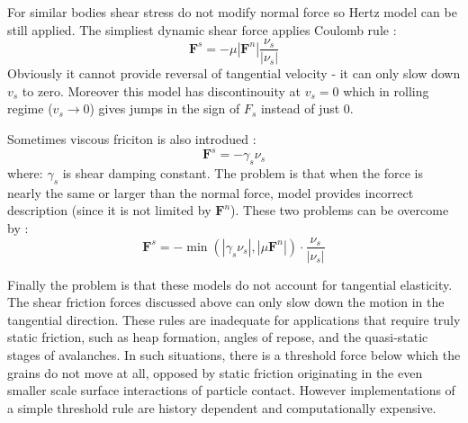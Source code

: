 \documentclass[10pt,a4paper]{article}
\begin{document}
For similar bodies shear stress do not modify normal force so Hertz model can be still applied. 
The simpliest dynamic shear force applies Coulomb rule \cite{haff86}:
\begin{equation}
 \mathbf{F}^s = -\mu |\mathbf{F}^n| \frac{\nu_s}{|\nu_s|}
\end{equation}
Obviously it cannot provide reversal of tangential velocity - it can only slow down $v_s$ to zero.
Moreover this model has discontinouity at $v_s = 0$ which in rolling regime ($v_s \rightarrow 0$) gives jumps in the sign of 
$F_s$ instead of just 0.

Sometimes viscous friciton is also introdued \cite{sok92b}:
\begin{equation}
 \mathbf{F}^s = -\gamma_s \nu_s
\end{equation}
where: $\gamma_s$ is shear damping constant. %
The problem is that when the force is nearly the same or larger than the normal force,
model provides incorrect description (since it is not limited by $\mathbf{F}^n$).
These two problems can be overcome by \cite{pb93, pb94, pb95}:
\begin{equation} \label{eq:stat1}
 \mathbf{F}^s = -\min(|\gamma_s \nu_s|,|\mu \mathbf{F}^n|) \cdot \frac{\nu_s}{|\nu_s|}
\end{equation}

Finally the problem is that these models do not account for tangential elasticity. 
The shear friction forces discussed above can only slow down the motion in the tangential direction.
These rules are inadequate for applications that require truly static friction, such as heap formation, angles of repose, and
the quasi-static stages of avalanches.  In such situations, there is a threshold force below which the grains do not move at  all, 
opposed by static friction originating in the even smaller scale surface interactions of particle contact. 
However implementations of a simple threshold rule are history dependent and computationally expensive. 
\end{document}
